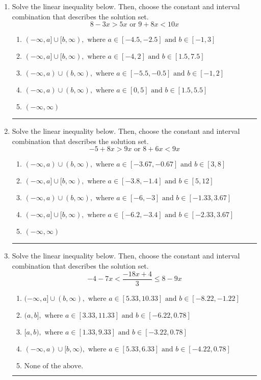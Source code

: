 \documentclass[14pt]{extbook}
\newcommand{\litem}[1]{\item#1\hspace*{-1cm}\rule{\textwidth}{0.4pt}}
\begin{document}
\begin{enumerate}
{\begin{enumerate}[label=\Alph*.]
\end{enumerate} }
\litem{
Solve the linear inequality below. Then, choose the constant and interval combination that describes the solution set.\[ 8 - 3 x > 5 x \text{ or } 9 + 8 x < 10 x \]\begin{enumerate}[label=\Alph*.]
\item \( (-\infty, a] \cup [b, \infty), \text{ where } a \in [-4.5, -2.5] \text{ and } b \in [-1, 3] \)
\item \( (-\infty, a] \cup [b, \infty), \text{ where } a \in [-4, 2] \text{ and } b \in [1.5, 7.5] \)
\item \( (-\infty, a) \cup (b, \infty), \text{ where } a \in [-5.5, -0.5] \text{ and } b \in [-1, 2] \)
\item \( (-\infty, a) \cup (b, \infty), \text{ where } a \in [0, 5] \text{ and } b \in [1.5, 5.5] \)
\item \( (-\infty, \infty) \)

\end{enumerate} }
\litem{
Solve the linear inequality below. Then, choose the constant and interval combination that describes the solution set.\[ -5 + 8 x > 9 x \text{ or } 8 + 6 x < 9 x \]\begin{enumerate}[label=\Alph*.]
\item \( (-\infty, a) \cup (b, \infty), \text{ where } a \in [-3.67, -0.67] \text{ and } b \in [3, 8] \)
\item \( (-\infty, a] \cup [b, \infty), \text{ where } a \in [-3.8, -1.4] \text{ and } b \in [5, 12] \)
\item \( (-\infty, a) \cup (b, \infty), \text{ where } a \in [-6, -3] \text{ and } b \in [-1.33, 3.67] \)
\item \( (-\infty, a] \cup [b, \infty), \text{ where } a \in [-6.2, -3.4] \text{ and } b \in [-2.33, 3.67] \)
\item \( (-\infty, \infty) \)

\end{enumerate} }
\litem{
Solve the linear inequality below. Then, choose the constant and interval combination that describes the solution set.\[ -4 - 7 x < \frac{-18 x + 4}{3} \leq 8 - 9 x \]\begin{enumerate}[label=\Alph*.]
\item \( (-\infty, a] \cup (b, \infty), \text{ where } a \in [5.33, 10.33] \text{ and } b \in [-8.22, -1.22] \)
\item \( (a, b], \text{ where } a \in [3.33, 11.33] \text{ and } b \in [-6.22, 0.78] \)
\item \( [a, b), \text{ where } a \in [1.33, 9.33] \text{ and } b \in [-3.22, 0.78] \)
\item \( (-\infty, a) \cup [b, \infty), \text{ where } a \in [5.33, 6.33] \text{ and } b \in [-4.22, 0.78] \)
\item \( \text{None of the above.} \)


\end{enumerate}}
\end{enumerate}
\end{document}
